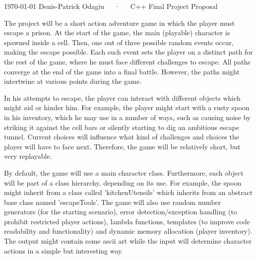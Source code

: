 \documentclass[11pt, a4paper]{awesome-cv}
\begin{document}
\makecvheader[L]

\makecvfooter
  {\today}
  {Denis-Patrick Odagiu~~~·~~~C++ Final Project Proposal}
  {}

\makelettertitle

\begin{cvletter}
\vspace{-2.5em}
The project will be a short action adventure game in which the player must escape a prison. At the start of the game, the main (playable) character is spawned inside a cell. Then, one out of three possible random events occur, making the escape possible. Each such event sets the player on a distinct path for the rest of the game, where he must face different challenges to escape. All paths converge at the end of the game into a final battle. However, the paths might intertwine at various points during the game.

In his attempts to escape, the player can interact with different objects which might aid or hinder him. For example, the player might start with a rusty spoon in his inventory, which he may use in a number of ways, such as causing noise by striking it against the cell bars or silently starting to dig an ambitious escape tunnel. Current choices will influence what kind of challenges and choices the player will have to face next. Therefore, the game will be relatively short, but very replayable.

By default, the game will use a main character class. Furthermore, each object will be part of a class hierarchy, depending on its use. For example, the spoon might inherit from a class called 'kitchenUtensils' which inherits from an abstract base class named 'escapeTools'. The game will also use random number generators (for the starting scenario), error detection/exception handling (to prohibit restricted player actions), lambda functions, templates (to improve code readability and functionality) and dynamic memory allocation (player inventory). The output might contain some ascii art while the input will determine character actions in a simple but interesting way.


\end{cvletter}
\end{document}
